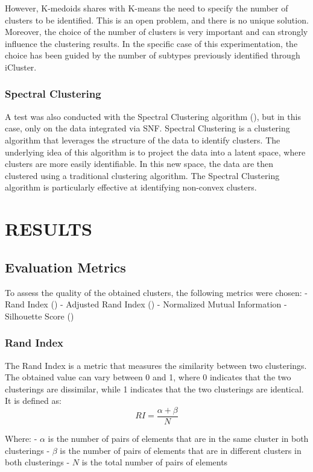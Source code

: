 \documentclass[12pt,a4paper]{article}
\begin{document}
However, K-medoids shares with K-means the need to specify the number of clusters to be identified. This is an open problem, and there is no unique solution. Moreover, the choice of the number of clusters is very important and can strongly influence the clustering results. In the specific case of this experimentation, the choice has been guided by the number of subtypes previously identified through iCluster.

\subsubsection{Spectral Clustering}
A test was also conducted with the Spectral Clustering algorithm (\cite{vonLuxburg2007}), but in this case, only on the data integrated via SNF.
Spectral Clustering is a clustering algorithm that leverages the structure of the data to identify clusters. The underlying idea of this algorithm is to project the data into a latent space, where clusters are more easily identifiable. In this new space, the data are then clustered using a traditional clustering algorithm. The Spectral Clustering algorithm is particularly effective at identifying non-convex clusters.

\pagebreak
\section{RESULTS}
\subsection{Evaluation Metrics}
To assess the quality of the obtained clusters, the following metrics were chosen:
- Rand Index (\cite{Hubert1985})
- Adjusted Rand Index (\cite{Hubert1985})
- Normalized Mutual Information
- Silhouette Score (\cite{Rousseeuw1987})

\subsubsection{Rand Index}
The Rand Index is a metric that measures the similarity between two clusterings. The obtained value can vary between 0 and 1, where 0 indicates that the two clusterings are dissimilar, while 1 indicates that the two clusterings are identical.
It is defined as:
$$ RI = \frac{\alpha + \beta}{N} $$

Where:
- $\alpha$ is the number of pairs of elements that are in the same cluster in both clusterings
- $\beta$ is the number of pairs of elements that are in different clusters in both clusterings
- $N$ is the total number of pairs of elements
\end{document}
